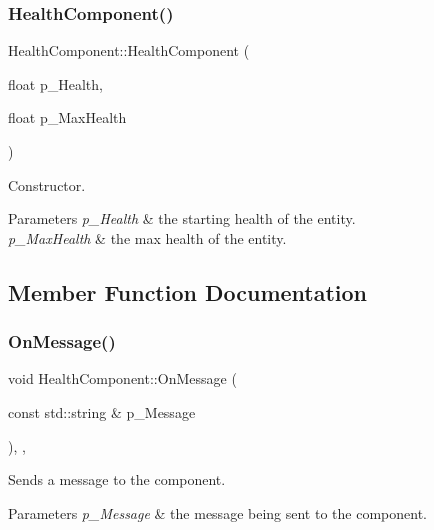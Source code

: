 \subsubsection{\texorpdfstring{HealthComponent()}{HealthComponent()}\hspace{0.1cm}{\footnotesize\ttfamily [2/2]}}
{\footnotesize\ttfamily Health\+Component\+::\+Health\+Component (\begin{DoxyParamCaption}\item[{float}]{p\+\_\+\+Health,  }\item[{float}]{p\+\_\+\+Max\+Health }\end{DoxyParamCaption})\hspace{0.3cm}{\ttfamily [inline]}}



Constructor. 


\begin{DoxyParams}{Parameters}
{\em p\+\_\+\+Health} & the starting health of the entity. \\
\hline
{\em p\+\_\+\+Max\+Health} & the max health of the entity. \\
\hline
\end{DoxyParams}


\subsection{Member Function Documentation}
\mbox{\label{class_health_component_aaaf08f6e3535e5cf0e94bddff815c11f}} 
\subsubsection{\texorpdfstring{OnMessage()}{OnMessage()}}
{\footnotesize\ttfamily void Health\+Component\+::\+On\+Message (\begin{DoxyParamCaption}\item[{const std\+::string \&}]{p\+\_\+\+Message }\end{DoxyParamCaption})\hspace{0.3cm}{\ttfamily [inline]}, {\ttfamily [override]}, {\ttfamily [virtual]}}



Sends a message to the component. 


\begin{DoxyParams}{Parameters}
{\em p\+\_\+\+Message} & the message being sent to the component. \\
\hline
\end{DoxyParams}


